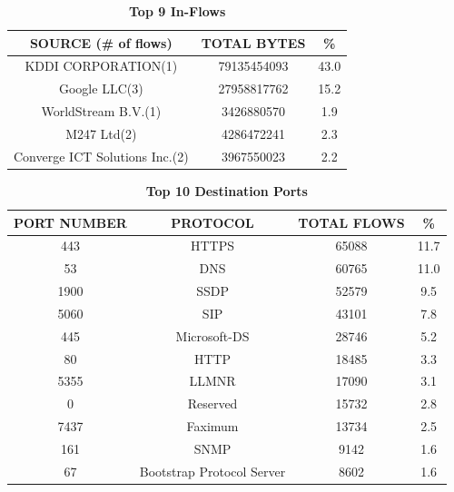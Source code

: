 \documentclass[journal]{IEEE/IEEEtran}
\begin{document}
\begin{table}[ht]
\centering
\caption{\textbf{Top 9 In-Flows}}
\label{top-in-flows}
\begin{tabular}{|c|c|c|}
\hline
\textbf{SOURCE (\# of flows)} 		& \textbf{TOTAL BYTES} 	& \textbf{\%} \\ \hline
    KDDI CORPORATION(1)				&  79135454093			& 43.0        \\ \hline
    Google LLC(3)					&  27958817762          & 15.2        \\ \hline
    WorldStream B.V.(1)				&  3426880570           & 1.9         \\ \hline
    M247 Ltd(2)						&  4286472241           & 2.3         \\ \hline
    Converge ICT Solutions Inc.(2)	&  3967550023			& 2.2         \\ \hline
\end{tabular}
\end{table}

\begin{table}[ht]
\centering
\caption{\textbf{Top 10 Destination Ports}}
\label{top-dest-ports}
\begin{tabular}{|c|c|c|c|}
\hline
\textbf{PORT NUMBER}			& \textbf{PROTOCOL}			& \textbf{TOTAL FLOWS}		& \textbf{\%} 	 \\ \hline
    443							& HTTPS						&  65088					& 11.7  	     \\ \hline
    53							& DNS						&  60765        			& 11.0			 \\ \hline
    1900						& SSDP						&  52579					& 9.5			 \\ \hline
    5060						& SIP						&  43101          			& 7.8   	     \\ \hline
    445							& Microsoft-DS				&  28746           			& 5.2        	 \\ \hline
    80							& HTTP						&  18485					& 3.3         	 \\ \hline
    5355						& LLMNR						&  17090    		        & 3.1    	     \\ \hline
    0							& Reserved					&  15732		            & 2.8       	 \\ \hline
    7437						& Faximum					&  13734        		    & 2.5         	 \\ \hline
    161							& SNMP						&  9142        			    & 1.6         	 \\ \hline
    67							& Bootstrap Protocol Server	&  8602        			    & 1.6         	 \\ \hline
\end{tabular}
\end{table}
\end{document}
